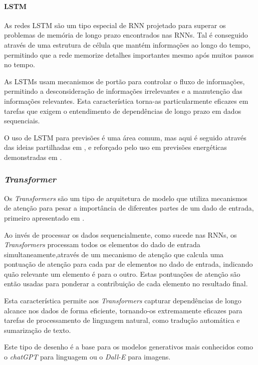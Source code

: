 \paragraph{LSTM\label{se:lstms_sec}}
\text{ }  \par

As redes \gls{LSTM} são um tipo especial de \gls{RNN} projetado para superar os problemas de memória de longo prazo encontrados nas \gls{RNN}s. Tal é conseguido através de uma estrutura de célula que mantém informações ao longo do tempo, permitindo que a rede memorize detalhes importantes mesmo após muitos passos no tempo.\par
As \gls{LSTM}s usam mecanismos de portão para controlar o fluxo de informações, permitindo a desconsideração de informações irrelevantes e a manutenção das informações relevantes. Esta característica torna-as particularmente eficazes em tarefas que exigem o entendimento de dependências de longo prazo em dados sequenciais.\par


O uso de \gls{LSTM} para previsões é uma área comum, mas aqui é seguido através das ideias partilhadas em \cite{Hewamalage2021}, e reforçado pelo uso em previsões energéticas demonstradas em \cite{Costa2022}.\par


\subsubsection{\textit{Transformer}\label{se:transformer_sec}}

Os \textit{Transformers} são um tipo de arquitetura de modelo que utiliza mecanismos de atenção para pesar a importância de diferentes partes de um dado de entrada, primeiro apresentado em \cite{Vaswani2017}.\par
Ao invés de processar os dados sequencialmente, como sucede nas RNNs, os \textit{Transformers} processam todos os elementos do dado de entrada simultaneamente,através de um mecanismo de atenção que calcula uma pontuação de atenção para cada par de elementos no dado de entrada, indicando quão relevante um elemento é para o outro. Estas pontuações de atenção são então usadas para ponderar a contribuição de cada elemento no resultado final.\par
Esta característica permite aos \textit{Transformers} capturar dependências de longo alcance nos dados de forma eficiente, tornando-os extremamente eficazes para tarefas de processamento de linguagem natural, como tradução automática e sumarização de texto.\par
Este tipo de desenho é a base para os modelos generativos mais conhecidos como o \textit{chatGPT} para linguagem ou o \textit{Dall-E} para imagens.\par


\thispagestyle{plain}
 \label{se:metstats}
